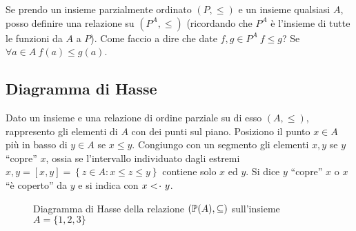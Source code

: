 \begin{defn}\label{ordine_funzioni}
Se prendo un insieme parzialmente ordinato $(P, \le)$ e un insieme qualsiasi $A$, posso definire una relazione su $(P^A, \le)$ (ricordando che $P^A$ \`e l'insieme di tutte le funzioni da $A$ a $P$). Come faccio a dire che date $f, g \in P^A \ f \le g$? Se $\forall a \in A \ f(a) \le g(a)$.
\end{defn}

\subsection{Diagramma di Hasse}

Dato un insieme e una relazione di ordine parziale su di esso $(A, \leq)$, rappresento gli elementi di $A$ con dei punti sul piano. Posiziono il punto $x \in A$ pi\`u in basso di $y \in A$ se $x \leq y$. Congiungo con un segmento gli elementi $x, y$ se $y$ ``copre'' $x$, ossia se l'intervallo individuato dagli estremi $x, y = [x, y] = \left \{ z \in A : x \leq z \leq y \right \}$ contiene solo $x$ ed $y$. Si dice $y$ ``copre'' $x$ o $x$ ``\`e coperto'' da $y$ e si indica con $x <\!\cdot \ y$.

\begin{figure}[ht]
\centering
{}
\caption{Diagramma di Hasse della relazione $(\mathbb{P}(A), \subseteq)$ sull'insieme $A = \{1, 2, 3\}$}
\end{figure}

